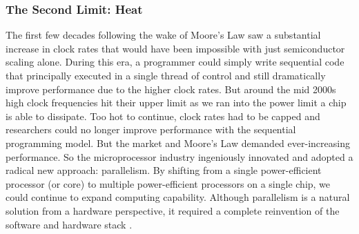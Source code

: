 \documentclass{article}
\begin{document}
\subsubsection{The Second Limit: Heat}
The first few decades following the wake of Moore's Law saw a substantial increase in clock rates that would have been impossible with just semiconductor scaling alone. During this era, a programmer could simply write sequential code that principally executed in a single thread of control and still dramatically improve performance due to the higher clock rates. But around the mid 2000s high clock frequencies hit their upper limit as we ran into the power limit a chip is able to dissipate. Too hot to continue, clock rates had to be capped and researchers could no longer improve performance with the sequential programming model. But the market and Moore's Law demanded ever-increasing performance. So the microprocessor industry ingeniously innovated and adopted a radical new approach: parallelism. By shifting from a single power-efficient processor (or core) to multiple power-efficient processors on a single chip, we could continue to expand computing capability. Although parallelism is a natural solution from a hardware perspective, it required a complete reinvention of the software and hardware stack \cite{asanovic2009view, pankratius2010guest}.

\end{document}
